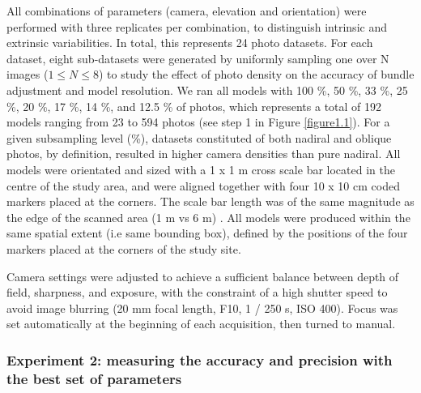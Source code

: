 All combinations of parameters (camera, elevation and orientation) were performed with three replicates per combination, to distinguish intrinsic and extrinsic variabilities. In total, this represents 24 photo datasets. For each dataset, eight sub-datasets were generated by uniformly sampling one over N images ($1 \leq N \leq 8$) to study the effect of photo density on the accuracy of bundle adjustment and model resolution. We ran all models with 100 \%, 50 \%, 33 \%, 25 \%, 20 \%, 17 \%, 14 \%, and 12.5 \% of photos, which represents a total of 192 models ranging from 23 to 594 photos (see step 1 in Figure \ref{figure1.1}). For a given subsampling level (\%), datasets constituted of both nadiral and oblique photos, by definition, resulted in higher camera densities than pure nadiral. All models were orientated and sized with a 1 x 1 m cross scale bar located in the centre of the study area, and were aligned together with four 10 x 10 cm coded markers placed at the corners. The scale bar length was of the same magnitude as the edge of the scanned area (1 m vs 6 m) \citep{vdi/vde_optical_2002}. All models were produced within the same spatial extent (i.e same bounding box), defined by the positions of the four markers placed at the corners of the study site.

Camera settings were adjusted to achieve a sufficient balance between depth of field, sharpness, and exposure, with the constraint of a high shutter speed to avoid image blurring (20 mm focal length, F10, 1 / 250 s, ISO 400). Focus was set automatically at the beginning of each acquisition, then turned to manual.

\subsubsection{Experiment 2: measuring the accuracy and precision with the best set of parameters}\label{chapitre1_2.1.2}

